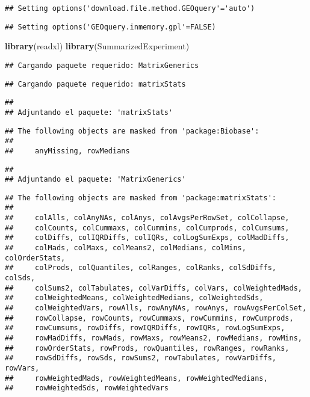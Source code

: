 \documentclass[
]{article}
\newenvironment{Shaded}{\begin{snugshade}}{\end{snugshade}}
\newcommand{\FunctionTok}[1]{\textcolor[rgb]{0.13,0.29,0.53}{\textbf{#1}}}
\newcommand{\NormalTok}[1]{#1}
\begin{document}
\begin{verbatim}
## Setting options('download.file.method.GEOquery'='auto')
\end{verbatim}

\begin{verbatim}
## Setting options('GEOquery.inmemory.gpl'=FALSE)
\end{verbatim}

\begin{Shaded}
\begin{Highlighting}[]
\FunctionTok{library}\NormalTok{(readxl)}
\FunctionTok{library}\NormalTok{(SummarizedExperiment)}
\end{Highlighting}
\end{Shaded}

\begin{verbatim}
## Cargando paquete requerido: MatrixGenerics
\end{verbatim}

\begin{verbatim}
## Cargando paquete requerido: matrixStats
\end{verbatim}

\begin{verbatim}
## 
## Adjuntando el paquete: 'matrixStats'
\end{verbatim}

\begin{verbatim}
## The following objects are masked from 'package:Biobase':
## 
##     anyMissing, rowMedians
\end{verbatim}

\begin{verbatim}
## 
## Adjuntando el paquete: 'MatrixGenerics'
\end{verbatim}

\begin{verbatim}
## The following objects are masked from 'package:matrixStats':
## 
##     colAlls, colAnyNAs, colAnys, colAvgsPerRowSet, colCollapse,
##     colCounts, colCummaxs, colCummins, colCumprods, colCumsums,
##     colDiffs, colIQRDiffs, colIQRs, colLogSumExps, colMadDiffs,
##     colMads, colMaxs, colMeans2, colMedians, colMins, colOrderStats,
##     colProds, colQuantiles, colRanges, colRanks, colSdDiffs, colSds,
##     colSums2, colTabulates, colVarDiffs, colVars, colWeightedMads,
##     colWeightedMeans, colWeightedMedians, colWeightedSds,
##     colWeightedVars, rowAlls, rowAnyNAs, rowAnys, rowAvgsPerColSet,
##     rowCollapse, rowCounts, rowCummaxs, rowCummins, rowCumprods,
##     rowCumsums, rowDiffs, rowIQRDiffs, rowIQRs, rowLogSumExps,
##     rowMadDiffs, rowMads, rowMaxs, rowMeans2, rowMedians, rowMins,
##     rowOrderStats, rowProds, rowQuantiles, rowRanges, rowRanks,
##     rowSdDiffs, rowSds, rowSums2, rowTabulates, rowVarDiffs, rowVars,
##     rowWeightedMads, rowWeightedMeans, rowWeightedMedians,
##     rowWeightedSds, rowWeightedVars
\end{verbatim}
\end{document}
